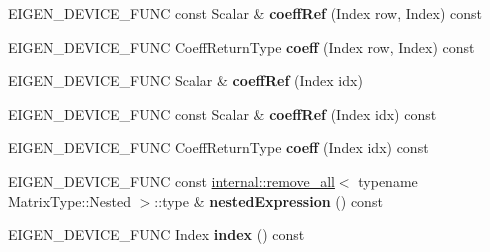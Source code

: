 \begin{DoxyCompactItemize}
\item 
\mbox{\label{class_eigen_1_1_diagonal_ac53e518ffa80b8652d6f4ac4afa06e37}} 
E\+I\+G\+E\+N\+\_\+\+D\+E\+V\+I\+C\+E\+\_\+\+F\+U\+NC const Scalar \& {\bfseries coeff\+Ref} (Index row, Index) const
\item 
\mbox{\label{class_eigen_1_1_diagonal_a1bf1ddeae9142fa0bafde8217bfc23cf}} 
E\+I\+G\+E\+N\+\_\+\+D\+E\+V\+I\+C\+E\+\_\+\+F\+U\+NC Coeff\+Return\+Type {\bfseries coeff} (Index row, Index) const
\item 
\mbox{\label{class_eigen_1_1_diagonal_a2c36161201a06ae3f20c80b5157cb0ce}} 
E\+I\+G\+E\+N\+\_\+\+D\+E\+V\+I\+C\+E\+\_\+\+F\+U\+NC Scalar \& {\bfseries coeff\+Ref} (Index idx)
\item 
\mbox{\label{class_eigen_1_1_diagonal_af084cb68fc8bec59da827733270651df}} 
E\+I\+G\+E\+N\+\_\+\+D\+E\+V\+I\+C\+E\+\_\+\+F\+U\+NC const Scalar \& {\bfseries coeff\+Ref} (Index idx) const
\item 
\mbox{\label{class_eigen_1_1_diagonal_a6f1052c78ebf956dba70a341fbbac2ec}} 
E\+I\+G\+E\+N\+\_\+\+D\+E\+V\+I\+C\+E\+\_\+\+F\+U\+NC Coeff\+Return\+Type {\bfseries coeff} (Index idx) const
\item 
\mbox{\label{class_eigen_1_1_diagonal_a9b2c6a58bd32daed5d1f000a1deecae7}} 
E\+I\+G\+E\+N\+\_\+\+D\+E\+V\+I\+C\+E\+\_\+\+F\+U\+NC const \mbox{\hyperlink{struct_eigen_1_1internal_1_1remove__all}{internal\+::remove\+\_\+all}}$<$ typename Matrix\+Type\+::\+Nested $>$\+::type \& {\bfseries nested\+Expression} () const
\item 
\mbox{\label{class_eigen_1_1_diagonal_a53a90de341103a939aee240d8c6c805c}} 
E\+I\+G\+E\+N\+\_\+\+D\+E\+V\+I\+C\+E\+\_\+\+F\+U\+NC Index {\bfseries index} () const
\end{DoxyCompactItemize}
